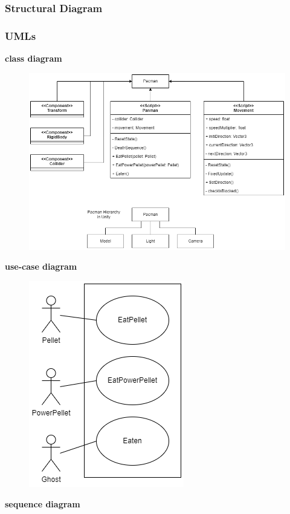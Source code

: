 \documentclass[11pt]{article}
\begin{document}
\subsubsection{Structural Diagram}
\subsubsection{UMLs}
\textbf{class diagram}\\
\begin{figure}[H]
    \centering
    \includegraphics*[scale=0.4]{Pacman_Class.png}
\end{figure}
\textbf{use-case diagram}\\
\begin{figure}[H]
    \centering
    \includegraphics*[scale=0.4]{Pacman_use-case.png}
\end{figure}
\textbf{sequence diagram}\\
\end{document}
